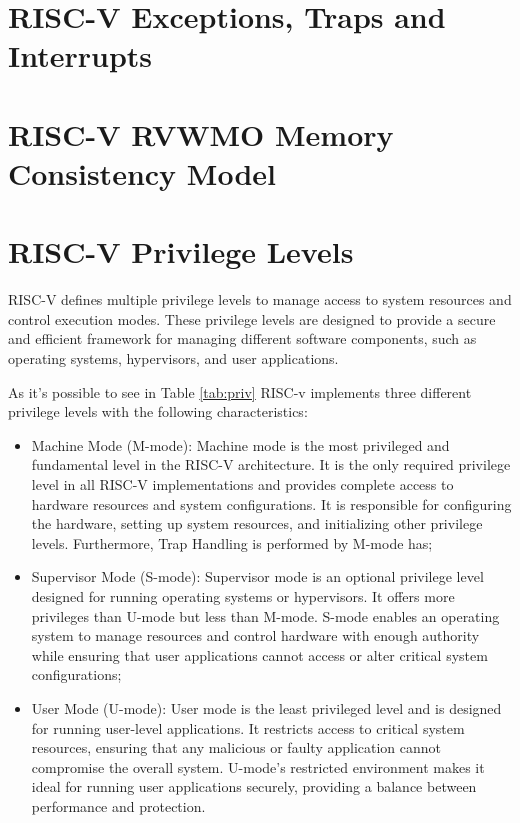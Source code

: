 \section{RISC-V Exceptions, Traps and Interrupts}
\label{sec:riscv_eti}

\lipsum[1]

\section{RISC-V RVWMO Memory Consistency Model}
\label{sec:riscv_rvwmo}

\lipsum[1]

\section{RISC-V Privilege Levels}
\label{sec:riscv_privileges}

RISC-V defines multiple privilege levels to manage access to system resources
and control execution modes. These privilege levels are designed to provide a secure
and efficient framework for managing different software components, such as
operating systems, hypervisors, and user applications.

As it's possible to see in Table \ref{tab:priv} RISC-v implements three
different privilege levels with the following characteristics:

\begin{itemize}
  \item Machine Mode (M-mode): Machine mode is the most privileged and
    fundamental level in the RISC-V architecture. It is the only required privilege
    level in all RISC-V implementations and provides complete access to hardware
    resources and system configurations. It is responsible for configuring the
    hardware, setting up system resources, and initializing other privilege
    levels. Furthermore, Trap Handling is performed by M-mode has;

  \item Supervisor Mode (S-mode): Supervisor mode is an optional privilege level
    designed for running operating systems or hypervisors. It offers more privileges
    than U-mode but less than M-mode. S-mode enables an operating system to
    manage resources and control hardware with enough authority while ensuring
    that user applications cannot access or alter critical system configurations;

  \item User Mode (U-mode): User mode is the least privileged level and is
    designed for running user-level applications. It restricts access to critical
    system resources, ensuring that any malicious or faulty application cannot
    compromise the overall system. U-mode’s restricted environment makes it ideal
    for running user applications securely, providing a balance between
    performance and protection.
\end{itemize}

